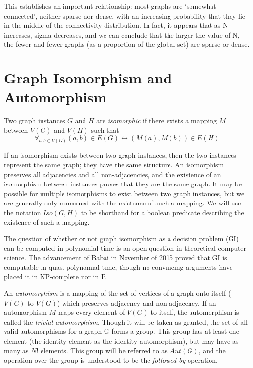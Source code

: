 This establishes an important relationship: most graphs are `somewhat connected', neither sparse nor dense, with an increasing probability that they lie in the middle of the connectivity distribution.
In fact, it appears that as N increases, sigma decreases, and we can conclude that the larger the value of N, the fewer and fewer graphs (as a proportion of the global set) are sparse or dense.

\section{Graph Isomorphism and Automorphism}

Two graph instances $G$ and $H$ are \emph{isomorphic} if there exists a mapping $M$ between $V(G)$ and $V(H)$ such that $$\forall_{a, b \in V(G)} (a, b) \in E(G) \leftrightarrow (M(a), M(b)) \in E(H)$$

If an isomorphism exists between two graph instances, then the two instances represent the same graph; they have the same structure.
An isomorphism preserves all adjacencies and all non-adjacencies, and the existence of an isomorphism between instances proves that they are the same graph.
It may be possible for multiple isomorphisms to exist between two graph instances, but we are generally only concerned with the existence of such a mapping.
We will use the notation $Iso(G, H)$ to be shorthand for a boolean predicate describing the existence of such a mapping.

The question of whether or not graph isomorphism as a decision problem (GI) can be computed in polynomial time is an open question in theoretical computer science.
The advancement of Babai in November of 2015 proved that GI is computable in quasi-polynomial time, though no convincing arguments have placed it in NP-complete nor in P.

An \emph{automorphism} is a mapping of the set of vertices of a graph onto itself ($V(G)$ to $V(G)$) which preserves adjacency and non-adjacency.
If an automorphism $M$ maps every element of $V(G)$ to itself, the automorphism is called the \emph{trivial automorphism}.
Though it will be taken as granted, the set of all valid automorphisms for a graph G forms a group.
This group has at least one element (the identity element as the identity automorphism), but may have as many as $N!$ elements.
This group will be referred to as $Aut(G)$, and the operation over the group is understood to be the \emph{followed by} operation.



